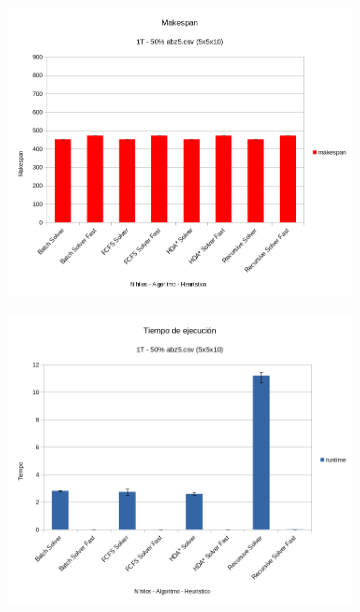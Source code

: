 \begin{figure}[H]
    \begin{subfigure}{.5\textwidth}
        \begin{center}
            \includegraphics[width=\textwidth]{Media/Ch2/XMakespan_1_Heuristics.png}        
        \end{center}
        \label{fig:Heuristico1}
    \end{subfigure}
    \begin{subfigure}{.5\textwidth}
        \begin{center}
            \includegraphics[width=\textwidth]{Media/Ch2/XRuntime_1_Heuristics.png}        

\end{center}
\end{subfigure}
\end{figure}
